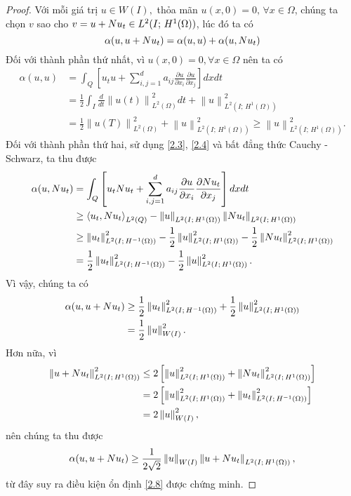 \documentclass[]{article}
\begin{document}
\begin{proof}
	Với mỗi giá trị $u\in W(I),$ thỏa mãn $u(x, 0)=0, \, \forall x\in \Omega$, chúng ta chọn $v$ sao cho $v=u+\mathnormal{N}u_t\in L^2(I;\, H^1(\Omega))$, lúc đó ta có
	$$\alpha(u, u+\mathnormal{N}u_t)=\alpha(u, u)+\alpha(u, \mathnormal{N}u_t)$$
	Đối với thành phần thứ nhất, vì $u(x, 0)=0, \forall x \in \Omega$ nên ta có
	\begin{align*}
	\alpha(u, u)&=\int_{Q}\left[u_tu+\sum_{i, j=1}^{d}a_{ij}\frac{\partial u}{\partial x_i}\frac{\partial u}{\partial x_j}\right]dxdt\\
	&=\frac{1}{2}\int_I\frac{d}{dt}\left\|u(t)\right\|^2_{L^2(\Omega)}dt+\left\|u\right\|^2_{L^2(I;\, H^1(\Omega))}\\
	&=\frac{1}{2}\left\|u(T)\right\|^2_{L^2(\Omega)}+\left\|u\right\|^2_{L^2(I;\, H^1(\Omega))}\geq \left\|u\right\|^2_{L^2(I;\, H^1(\Omega))}.
	\end{align*}
	Đối với thành phần thứ hai, sử dụng \eqref{2.3}, \eqref{2.4} và bất đẳng thức Cauchy - Schwarz, ta thu được
	\begin{align*}
	\alpha(u, \mathnormal{N}u_t)&=\int_{Q}\left[u_t\mathnormal{N}u_t+\sum_{i, j=1}^{d}a_{ij}\frac{\partial u}{\partial x_i}\frac{\partial \mathnormal{N}u_t}{\partial x_j}\right]dxdt\\
	&\geq\left\langle u_t, \mathnormal{N}u_t\right\rangle_{L^2(Q)}-\left\|u \right\|_{L^2(I;\, H^1(\Omega))}\left\| \mathnormal{N}u_t\right\|_{L^2(I;\, H^1(\Omega))}\\
	&\geq\left\|u_t\right\|^2_{L^2(I;\, H^{-1}(\Omega))}-\frac{1}{2}\left\|u \right\|_{L^2(I;\, H^1(\Omega))}^2-\frac{1}{2}\left\| \mathnormal{N}u_t\right\|_{L^2(I;\, H^1(\Omega))}^2\\
	&=\frac{1}{2}\left\|u_t\right\|^2_{L^2(I;\, H^{-1}(\Omega))}-\frac{1}{2}\left\|u \right\|_{L^2(I;\, H^1(\Omega))}^2.
	\end{align*}
	Vì vậy, chúng ta có
	\begin{align*}
	\alpha(u, u+\mathnormal{N}u_t)&\geq \frac{1}{2}\left\| u_t\right\|_{L^2(I;\, H^{-1}(\Omega))}^2+\frac{1}{2}\left\|u \right\|_{L^2(I;\, H^1(\Omega))}^2\\
	&=\frac{1}{2}\left\| u\right\|_{W(I)}^2.
	\end{align*}
	Hơn nữa, vì
	\begin{align*}
	\left\|u+\mathnormal{N}u_t \right\|_{L^2(I;\, H^1(\Omega))}^2&\leq 2 \left[\left\|u \right\|_{L^2(I;\, H^1(\Omega))}^2+\left\| \mathnormal{N}u_t\right\|_{L^2(I;\, H^1(\Omega))}^2\right]\\
	&=2 \left[\left\|u \right\|_{L^2(I;\, H^1(\Omega))}^2+\left\|u_t\right\|_{L^2(I;\, H^{-1}(\Omega))}^2\right]\\
	&=2\left\| u\right\|_{W(I)}^2,
	\end{align*}
	nên chúng ta thu được
	$$\alpha(u,u+\mathnormal{N}u_t)\geq \frac{1}{2\sqrt{2}}\left\| u\right\|_{W(I)}\left\|u+\mathnormal{N}u_t \right\|_{L^2(I;\, H^1(\Omega))},$$
	từ đây suy ra điều kiện ổn định \eqref{2.8} được chứng minh.
\end{proof}
\end{document}
